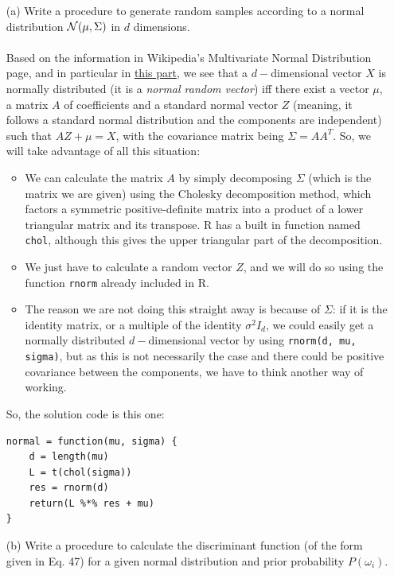 \documentclass[10pt]{article}
\begin{document}
  \begin{enumerate}
\Large
    \item[(a)] Write a procedure to generate random samples according to a normal distribution $\mathcal N(\boldmath\mu,\boldmath\Sigma)$ in $d$ dimensions.\\ \ \\
\normalsize
        Based on the information in Wikipedia's Multivariate Normal Distribution page, and in particular in \href{https://en.wikipedia.org/wiki/Multivariate_normal_distribution#Normal_random_vector}{this part}, we see that a $d-$dimensional vector $X$ is normally distributed (it is a \textit{normal random vector}) iff there exist a vector $\mu$, a matrix $A$ of coefficients and a standard normal vector $Z$ (meaning, it follows a standard normal distribution and the components are independent) such that $AZ + \mu = X$, with the covariance matrix being $\Sigma=AA^T$. So, we will take advantage of all this situation:
        \begin{itemize}
          \item We can calculate the matrix $A$ by simply decomposing $\Sigma$ (which is the matrix we are given) using the Cholesky decomposition method, which factors a symmetric positive-definite matrix into a product of a lower triangular matrix and its transpose. R has a built in function named \verb|chol|, although this gives the upper triangular part of the decomposition.
          \item We just have to calculate a random vector $Z$, and we will do so using the function \verb|rnorm| already included in R.
          \item The reason we are not doing this straight away is because of $\Sigma$: if it is the identity matrix, or a multiple of the identity $\sigma^2I_d$, we could easily get a normally distributed $d-$dimensional vector by using \verb|rnorm(d, mu, sigma)|, but as this is not necessarily the case and there could be positive covariance between the components, we have to think another way of working.
        \end{itemize}
        So, the solution code is this one:
        \begin{verbatim}
normal = function(mu, sigma) {
    d = length(mu)
    L = t(chol(sigma))
    res = rnorm(d)
    return(L %*% res + mu)
}
        \end{verbatim}
\Large
    \item[(b)] Write a procedure to calculate the discriminant function (of the form given in Eq. 47) for a given normal distribution and prior probability $P(\omega_i)$.\\ \ \\

\end{enumerate}
\end{document}
